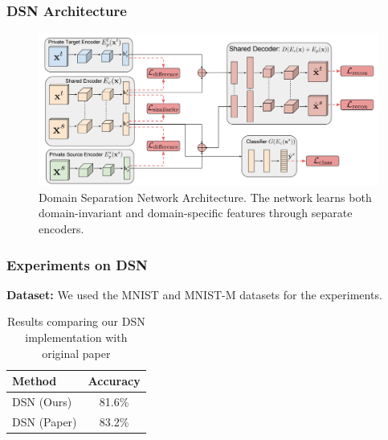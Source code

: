 \documentclass{beamer}
\begin{document}
\begin{frame}
    \frametitle{DSN Architecture}

    \begin{figure}
        \centering
        \includegraphics[width=0.9\linewidth]{DSN_Architecture.png}
        \caption{Domain Separation Network Architecture. The network learns both domain-invariant and domain-specific features through separate encoders.}
    \end{figure}

\end{frame}



    


\begin{frame}
    \frametitle{Experiments on DSN}
    \textbf{Dataset:} We used the MNIST and MNIST-M datasets for the experiments.\\

    \begin{table}[h]
        \centering
        \begin{tabular}{lc}
        \toprule
        \textbf{Method} & \textbf{Accuracy} \\
        \midrule
        DSN (Ours) & 81.6\% \\
        DSN (Paper) & 83.2\% \\
        \bottomrule
      \end{tabular}
      \caption{Results comparing our DSN implementation with original paper}
    \end{table}


    

\end{frame}
\end{document}
